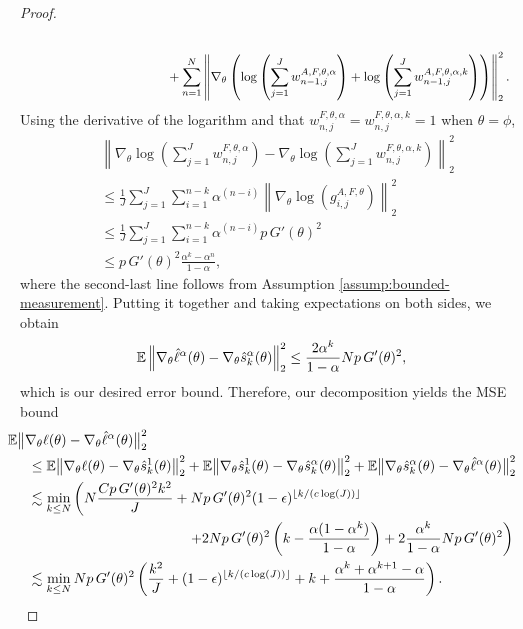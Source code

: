 \begin{proof}
\begin{align}
    \\ & \hspace{40mm}
    +\sum_{n=1}^N \left\lVert\nabla_\theta \left(\log\left(\sum_{j=1}^Jw_{n-1,j}^{A, F,\theta, \alpha}\right) + \log\left(\sum_{j=1}^Jw_{n-1,j}^{A, F,\theta,\alpha, k}\right)\right)\right\rVert_2^2.
\end{align}
Using the derivative of the logarithm and that $w_{n,j}^{F,\theta,\alpha} = w_{n,j}^{F,\theta,\alpha,k} = 1$ when $\theta=\phi$,
\begin{align}
    &\left\lVert\nabla_\theta\log\left(\sum_{j=1}^J w_{n,j}^{F,\theta,\alpha}\right)-\nabla_\theta\log\left(\sum_{j=1}^J w_{n,j}^{F,\theta,\alpha,k}\right)\right\rVert_2^2\\
    &\leq \frac{1}{J}\sum_{j=1}^J \sum_{i=1}^{n-k}\alpha^{(n-i)}\left\lVert\nabla_\theta\log\left(g_{i,j}^{A,F,\theta} \right)\right\rVert_2^2\\
    &\leq \frac{1}{J}\sum_{j=1}^J \sum_{i=1}^{n-k}\alpha^{(n-i)}p \, G'(\theta)^2\\
    &\leq p \, G'(\theta)^2\frac{\alpha^k-\alpha^n}{1-\alpha},
\end{align}
where the second-last line follows from Assumption \ref{assump:bounded-measurement}. Putting it together and taking expectations on both sides, we obtain
\begin{equation}
\mathbb{E}\left\lVert\nabla_\theta\hat\ell^\alpha(\theta) - \nabla_\theta \hat s_k^\alpha(\theta) \right\rVert_2^2 \leq  \frac{2\alpha^k}{1-\alpha}Np \, G'(\theta)^2,
\end{equation}
which is our desired error bound. 
Therefore, our decomposition yields the MSE bound
\begin{align}
    & \hspace{-5mm}
    \E\big\|\nabla_\theta\ell(\theta) - \nabla_\theta \hat\ell^\alpha(\theta)\big\|_2^2 
    \\
    &\leq \E\big\|\nabla_\theta\ell(\theta) - \nabla_\theta\hat s_k^1(\theta)\big\|_2^2 + \E\big\|\nabla_\theta\hat s_k^1(\theta) - \nabla_\theta\hat s_k^\alpha(\theta)\big\|_2^2 + \E\big\|\nabla_\theta\hat s_k^\alpha(\theta) -  \nabla_\theta\hat\ell^\alpha(\theta)\big\|_2^2 
    \\ \nonumber
    &\lesssim \min_{k \leq N} \left(N\frac{Cp \, G'(\theta)^2k^2}{J} + Np \, G'(\theta)^2(1-\epsilon)^{\floor{k/(c\log(J))}} \right.
    \\
    & \hspace{40mm} \left.
    + 2Np \, G'(\theta)^2\left(k-\frac{\alpha(1-\alpha^k)}{1-\alpha}\right) + 2\frac{\alpha^k}{1-\alpha}Np \, G'(\theta)^2\right) \\
    &\lesssim \min_{k \leq N} Np \, G'(\theta)^2\left(\frac{k^2}{J}+(1-\epsilon)^{\floor{k/(c\log(J))}}+k+\frac{\alpha^k  + \alpha^{k+1} - \alpha}{1-\alpha}\right).
\end{align}

\end{proof}

